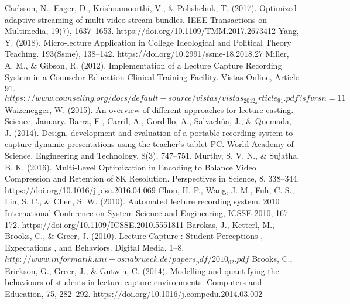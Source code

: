 \documentclass[conference]{IEEEtran}
\begin{document}
\begin{thebibliography}{00}
Carlsson, N., Eager, D., Krishnamoorthi, V., \& Polishchuk, T. (2017). Optimized adaptive streaming of multi-video stream bundles. IEEE Transactions on Multimedia, 19(7), 1637–1653. https://doi.org/10.1109/TMM.2017.2673412
Yang, Y. (2018). Micro-lecture Application in College Ideological and Political Theory Teaching. 193(Ssme), 138–142. https://doi.org/10.2991/ssme-18.2018.27
Miller, A. M., \& Gibson, R. (2012). Implementation of a Lecture Capture Recording System in a Counselor Education Clinical Training Facility. Vistas Online, Article 91. $https://www.counseling.org/docs/default-source/vistas/vistas_2012_article_91.pdf?sfvrsn=11$
Waizenegger, W. (2015). An overview of different approaches for lecture casting. Science, January.
Barra, E., Carril, A., Gordillo, A., Salvachúa, J., \& Quemada, J. (2014). Design, development and evaluation of a portable recording system to capture dynamic presentations using the teacher’s tablet PC. World Academy of Science, Engineering and Technology, 8(3), 747–751.
Murthy, S. V. N., \& Sujatha, B. K. (2016). Multi-Level Optimization in Encoding to Balance Video Compression and Retention of 8K Resolution. Perspectives in Science, 8, 338–344. https://doi.org/10.1016/j.pisc.2016.04.069
Chou, H. P., Wang, J. M., Fuh, C. S., Lin, S. C., \& Chen, S. W. (2010). Automated lecture recording system. 2010 International Conference on System Science and Engineering, ICSSE 2010, 167–172. https://doi.org/10.1109/ICSSE.2010.5551811
Barokas, J., Ketterl, M., Brooks, C., \& Greer, J. (2010). Lecture Capture : Student Perceptions , Expectations , and Behaviors. Digital Media, 1–8. $http://www.informatik.uni-osnabrueck.de/papers_pdf/2010_02.pdf$
Brooks, C., Erickson, G., Greer, J., \& Gutwin, C. (2014). Modelling and quantifying the behaviours of students in lecture capture environments. Computers and Education, 75, 282–292. https://doi.org/10.1016/j.compedu.2014.03.002
\end{thebibliography}
\end{document}
